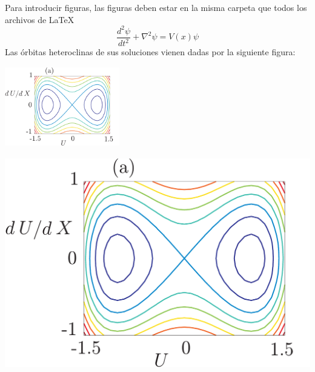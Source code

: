\documentclass{article}
\begin{document}
Para introducir figuras, las figuras deben estar en la misma carpeta que todos los archivos de LaTeX
$$
\frac{d^2\psi}{dt^2}+\nabla^2\psi=V(x)\psi
$$
Las órbitas heteroclinas de sus soluciones vienen dadas por la siguiente figura: 
\begin{center}
\includegraphics[width=5cm,height=3.5cm]{figura1} %
\end{center}
\begin{center}
\includegraphics[scale=0.28]{figura1} %
\end{center}
\end{document}
